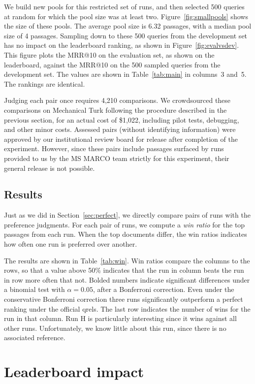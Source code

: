 \documentclass[fullpage]{article}
\begin{document}
We build new pools for this restricted set of runs, and then selected 500 queries at random for which the pool size was at least two. Figure~\ref{fig:smallpools} shows the size of these pools. The average pool size is 6.32 passages, with a median pool size of 4 passages. Sampling down to these 500 queries from the development set has no impact on the leaderboard ranking, as shown in Figure~\ref{fig:evalvsdev}. This figure plots the MRR@10 on the evaluation set, as shown on the leaderboard, against the MRR@10 on the 500 sampled queries from the development set. The values are shown in Table~\ref{tab:main} in columns~3 and~5. The rankings are identical.

Judging each pair once requires 4,210 comparisons. We crowdsourced these comparisons on Mechanical Turk following the procedure described in the previous section, for an actual cost of \$1,022, including pilot tests, debugging, and other minor costs. Assessed pairs (without identifying information) were approved by our institutional review board for release after completion of the experiment. However, since these pairs include passages surfaced by runs provided to us by the MS MARCO team strictly for this experiment, their general release is not possible.

\subsection{Results}

Just as we did in Section~\ref{sec:perfect}, we directly compare pairs of runs with the preference judgments. For each pair of runs, we compute a {\em win ratio} for the top passages from each run. When the top documents differ, the win ratios indicates how often one run is preferred over another.

The results are shown in Table~\ref{tab:win}. Win ratios compare the columns to the rows, so that a value above 50\% indicates that the run in column beats the run in row more often that not. Bolded numbers indicate significant differences under a binomial test with $\alpha = 0.05$, after a Bonferroni correction. Even under the conservative Bonferroni correction three runs significantly outperform a perfect ranking under the official qrels. The last row indicates the number of wins for the run in that column. Run H is particularly interesting since it wins against all other runs. Unfortunately, we know little about this run, since there is no associated reference.


\section{Leaderboard impact}
\label{sec:leader}
\end{document}

